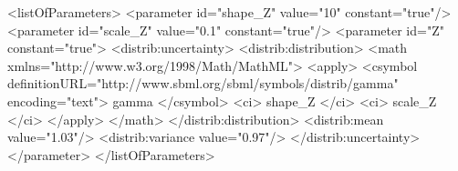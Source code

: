 \documentclass[draftspec]{sbmlpkgspec}
\begin{document}

\begin{example}
  <listOfParameters>
    <parameter id="shape_Z" value="10" constant="true"/>
    <parameter id="scale_Z" value="0.1" constant="true"/>
    <parameter id="Z" constant="true">
      <distrib:uncertainty>
        <distrib:distribution>
          <math xmlns="http://www.w3.org/1998/Math/MathML">
            <apply>
              <csymbol definitionURL="http://www.sbml.org/sbml/symbols/distrib/gamma"
                       encoding="text"> gamma </csymbol>
              <ci> shape_Z </ci>
              <ci> scale_Z </ci>
            </apply>
          </math>
        </distrib:distribution>
        <distrib:mean value="1.03"/>
        <distrib:variance value="0.97"/>
      </distrib:uncertainty>
    </parameter>
  </listOfParameters>
\end{example}
\end{document}

